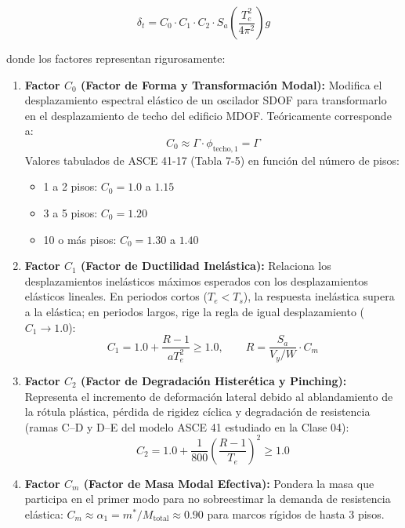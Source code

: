 \documentclass[11pt,letterpaper]{article}
\begin{document}
\begin{equation}
    \delta_t = C_0 \cdot C_1 \cdot C_2 \cdot S_a \left( \frac{T_e^2}{4\pi^2} \right) g
    \label{eq:asce41_delta_t}
\end{equation}

donde los factores representan rigurosamente:

\begin{enumerate}
    \item \textbf{Factor $C_0$ (Factor de Forma y Transformación Modal):}
    Modifica el desplazamiento espectral elástico de un oscilador SDOF para transformarlo en el desplazamiento de techo del edificio MDOF. Teóricamente corresponde a:
    \begin{equation}
        C_0 \approx \Gamma \cdot \phi_{\text{techo},1} = \Gamma
    \end{equation}
    Valores tabulados de ASCE 41-17 (Tabla 7-5) en función del número de pisos:
    \begin{itemize}
        \item 1 a 2 pisos: $C_0 = 1.0$ a $1.15$
        \item 3 a 5 pisos: $C_0 = 1.20$
        \item 10 o más pisos: $C_0 = 1.30$ a $1.40$
    \end{itemize}

    \item \textbf{Factor $C_1$ (Factor de Ductilidad Inelástica):}
    Relaciona los desplazamientos inelásticos máximos esperados con los desplazamientos elásticos lineales. En periodos cortos ($T_e < T_s$), la respuesta inelástica supera a la elástica; en periodos largos, rige la regla de igual desplazamiento ($C_1 \to 1.0$):
    \begin{equation}
        C_1 = 1.0 + \frac{R - 1}{a T_e^2} \ge 1.0, \qquad R = \frac{S_a}{V_y / W} \cdot C_m
    \end{equation}

    \item \textbf{Factor $C_2$ (Factor de Degradación Histerética y Pinching):}
    Representa el incremento de deformación lateral debido al ablandamiento de la rótula plástica, pérdida de rigidez cíclica y degradación de resistencia (ramas C--D y D--E del modelo ASCE 41 estudiado en la Clase 04):
    \begin{equation}
        C_2 = 1.0 + \frac{1}{800} \left( \frac{R - 1}{T_e} \right)^2 \ge 1.0
    \end{equation}

    \item \textbf{Factor $C_m$ (Factor de Masa Modal Efectiva):}
    Pondera la masa que participa en el primer modo para no sobreestimar la demanda de resistencia elástica: $C_m \approx \alpha_1 = m^* / M_{\text{total}} \approx 0.90$ para marcos rígidos de hasta 3 pisos.
\end{enumerate}
\end{document}
